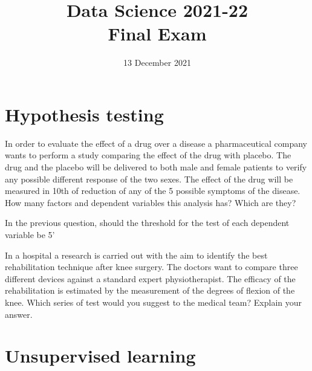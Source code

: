 \documentclass[11pt]{article}
\title{
\vspace{-1.2cm}
Data Science 2021-22\\ Final Exam}
\author{13 December 2021}
\date{}%
\newcounter{marks}
\begin{document}
\maketitle


\section*{Hypothesis testing}
\begin{list}{{\bf Question 1.:}}
	{
	}

\item
{}
\addtocounter{marks}{1}
In order to evaluate the effect of a drug over a disease a pharmaceutical company wants to perform a study comparing the effect of the drug with placebo. The drug and the placebo will be delivered to both male and female patients to verify any possible different response of the two sexes. The effect of the drug will be measured in 10th of reduction of any of the 5 possible symptoms of the disease. How many factors and dependent variables this analysis has? Which are they?

\item
{}
\addtocounter{marks}{1}
In the previous question, should the threshold for the test of each dependent variable be 5'%

\item
{}
\addtocounter{marks}{1}
In a hospital a research is carried out with the aim to identify the best rehabilitation technique after knee surgery. The doctors want to compare three different devices against a standard expert physiotherapist. The efficacy of the rehabilitation is estimated by the measurement of the degrees of flexion of the knee. Which series of test would you suggest to the medical team? Explain your answer.

\end{list}

\pagebreak


\section*{Unsupervised learning}
\begin{list}{{\bf Question 2.:}}
	{
	}

\item
{}
\addtocounter{marks}{1}


\item
{}
\addtocounter{marks}{1}

\end{list}
\end{document}
